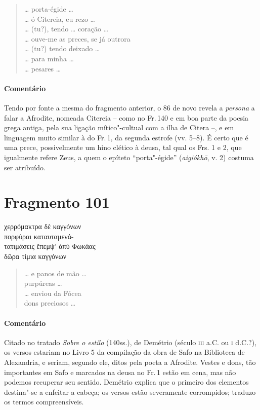 \begin{verse}
\ldots{} porta-égide \ldots{}\\
\ldots{} ó Citereia, eu rezo \ldots{}\\
\ldots{} (tu?), tendo \ldots{} coração \ldots{}\\
\ldots{} ouve-me as preces, se já outrora\\
\ldots{} (tu?) tendo deixado \ldots{}\\
\ldots{} para minha \ldots{}\\
\ldots{} pesares \ldots{}
\end{verse}

{\paragraph{Comentário} Tendo por fonte a mesma do fragmento anterior, o 86 de novo revela a \textit{persona} a falar a Afrodite, nomeada Citereia -- como no Fr.\,140 e em boa parte da poesia grega antiga, pela sua ligação mítico"-cultual com a ilha de Citera --, e em linguagem muito similar à do Fr.\,1, da segunda estrofe (vv. 5--8). É certo que é uma prece, possivelmente um hino clético à deusa, tal qual os Frs. 1 e 2, que igualmente refere Zeus, a quem o epíteto ``porta"-égide'' (\textit{aigiókhō}, v. 2) costuma ser atribuído.}

\pagebreak

\section{Fragmento 101}

\begin{gkverse}
χερρόμακτρα δὲ \dagger{}καγγόνων\dagger{}\\
πορφύραι \dagger{}καταυταμενἀ-\\
τατιμάσεις\dagger{} ἔπεμψ’ ἀπὺ Φωκάας\\
δῶρα τίμια \dagger{}καγγόνων\dagger{}\\
\end{gkverse}

\begin{verse}
\ldots{} e panos de mão \ldots{}\\
purpúreas \ldots{}\\
\ldots{} enviou da Fócea\\
dons preciosos \ldots{}
\end{verse}

{\paragraph{Comentário} Citado no tratado \textit{Sobre o estilo} (140ss.), de Demétrio (século \textsc{iii} a.C. ou \textsc{i} d.C.?), os versos estariam no Livro 5 da compilação da obra de Safo na Biblioteca de Alexandria, e seriam, segundo ele, ditos pela poeta a Afrodite. Vestes e dons, tão importantes em Safo e marcados na deusa no Fr.\,1 estão em cena, mas não podemos recuperar seu sentido. Demétrio explica que o primeiro dos elementos destina"-se a enfeitar a cabeça; os versos estão severamente corrompidos; traduzo os termos compreensíveis.}

